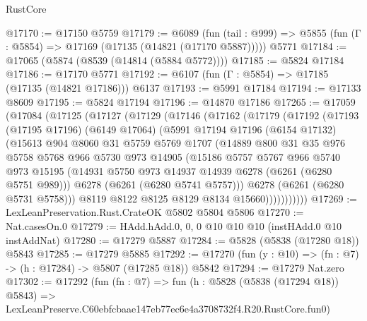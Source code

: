 \begin{lexlean}{RustCore}
\begin{coremodule}
@17170 := @17150 @5759
@17179 := @6089
    (fun (tail : @999) => @5855 (fun (Γ : @5854) => @17169 (@17135 (@14821 (@17170 @5887)))))
    @5771
@17184 := @17065 (@5874 (@8539 (@14814 (@5884 @5772))))
@17185 := @5824 @17184
@17186 := @17170 @5771
@17192 := @6107 (fun (Γ : @5854) => @17185 (@17135 (@14821 @17186))) @6137
@17193 := @5991 @17184
@17194 := @17133 @8609
@17195 := @5824 @17194
@17196 := @14870 @17186
@17265 := @17059
    (@17084
      (@17125
        (@17127
          (@17129
            (@17146
              (@17162
                (@17179
                  (@17192
                    (@17193
                      (@17195 @17196)
                      (@6149 @17064)
                      (@5991
                        @17194
                        @17196
                        (@6154 @17132)
                        (@15613
                          @904
                          @8060
                          @31
                          @5759
                          @5769
                          @1707
                          (@14889
                            @800
                            @31
                            @35
                            @976
                            @5758
                            @5768
                            @966
                            @5730
                            @973
                            @14905
                            (@15186
                              @5757
                              @5767
                              @966
                              @5740
                              @973
                              @15195
                              (@14931 @5750 @973 @14937 @14939 @6278 (@6261 (@6280 @5751 @989)))
                              @6278
                              (@6261 (@6280 @5741 @5757)))
                            @6278
                            (@6261 (@6280 @5731 @5758)))
                          @8119
                          @8122
                          @8125
                          @8129
                          @8134
                          @15660)))))))))))
@17269 := LexLeanPreservation.Rust.CrateOK @5802 @5804 @5806
@17270 := Nat.casesOn.{0}
@17279 := HAdd.hAdd.{0, 0, 0} @10 @10 @10 (instHAdd.{0} @10 instAddNat)
@17280 := @17279 @5887
@17284 := @5828 (@5838 (@17280 @18)) @5843
@17285 := @17279 @5885
@17292 := @17270 (fun (y : @10) => (fn : @7) -> (h : @17284) -> @5807 (@17285 @18)) @5842
@17294 := @17279 Nat.zero
@17302 := @17292
    (fun (fn : @7) =>
    fun (h : @5828 (@5838 (@17294 @18)) @5843) =>
    LexLeanPreserve.C60ebfcbaae147eb77ec6e4a3708732f4.R20.RustCore.fun0)

\end{coremodule}
\end{lexlean}
